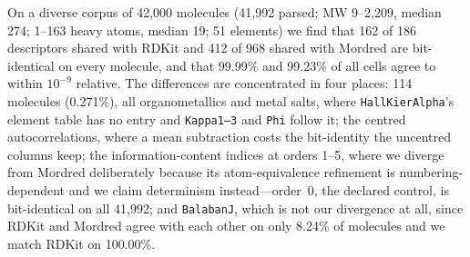 
On a diverse corpus of 42{,}000 molecules (41{,}992 parsed; MW 9--2{,}209, median 274;
1--163 heavy atoms, median 19; 51 elements) we find that 162 of 186 descriptors shared
with RDKit and 412 of 968 shared with Mordred are bit-identical on every molecule, and
that 99.99\% and 99.23\% of all cells agree to within $10^{-9}$ relative. The differences
are concentrated in four places: 114 molecules (0.271\%), all organometallics and metal
salts, where \texttt{HallKierAlpha}'s element table has no entry and \texttt{Kappa1--3}
and \texttt{Phi} follow it; the centred autocorrelations, where a mean subtraction costs
the bit-identity the uncentred columns keep; the information-content indices at orders
1--5, where we diverge from Mordred deliberately because its atom-equivalence refinement
is numbering-dependent and we claim determinism instead---order~0, the declared control,
is bit-identical on all 41{,}992; and \texttt{BalabanJ}, which is not our divergence at
all, since RDKit and Mordred agree with each other on only 8.24\% of molecules and we
match RDKit on 100.00\%.
